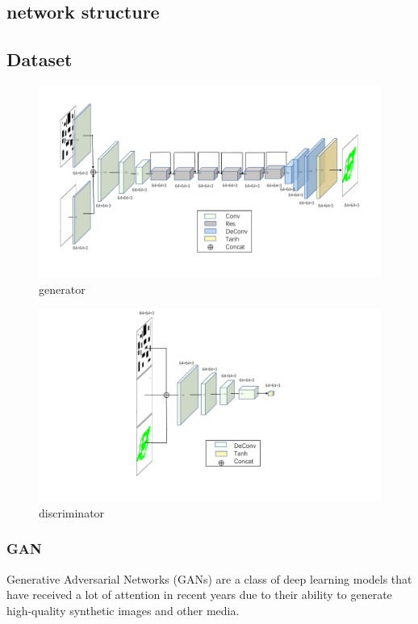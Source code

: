 \documentclass[smallcondensed]{svjour3}     %
\begin{document}
\subsection{network structure}
\subsection{Dataset}
\begin{figure}
\centering
\includegraphics[scale=0.3]{network-CGGenerator.pdf}%
\caption{generator}     
\label{fig:generator}
\end{figure}

\begin{figure}
\centering
\includegraphics[scale=0.4]{network-CGDiscriminator.pdf}%
\caption{discriminator}     
\label{fig:discriminator}
\end{figure}


\subsubsection{GAN}
Generative Adversarial Networks (GANs) are a class of deep learning models that have received a lot of attention in recent years due to their ability to generate high-quality synthetic images and other media. 
\end{document}

